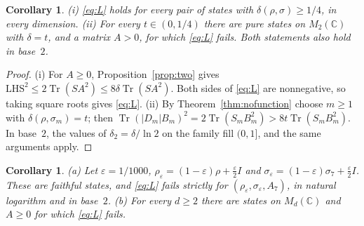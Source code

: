 \documentclass[11pt]{amsart}
\newtheorem{corollary}[theorem]{Corollary}
\theoremstyle{definition}\newtheorem{definition}[theorem]{Definition}
\theoremstyle{remark}\newtheorem{remark}[theorem]{Remark}
\DeclareMathOperator{\Tr}{Tr}
\newcommand{\C}{\mathbb{C}}
\newcommand{\abs}[1]{\lvert #1\rvert}
\newcommand{\LHS}{\mathrm{LHS}}
\begin{document}
\begin{corollary}\label{cor:threshold}
\textup{(i)} \eqref{eq:L} holds for every pair of states with \(\delta(\rho,\sigma)\ge1/4\), in every dimension. \textup{(ii)} For every \(t\in(0,1/4)\) there are pure states on \(M_2(\C)\) with \(\delta=t\), and a matrix \(A>0\), for which \eqref{eq:L} fails. Both statements also hold in base~\(2\).
\end{corollary}

\begin{proof}
(i) For \(A\ge0\), Proposition~\ref{prop:two} gives \(\LHS^2\le2\Tr(SA^2)\le8\delta\Tr(SA^2)\). Both sides of \eqref{eq:L} are nonnegative, so taking square roots gives \eqref{eq:L}. (ii) By Theorem~\ref{thm:nofunction} choose \(m\ge1\) with \(\delta(\rho,\sigma_m)=t\); then \(\Tr(\abs{D_m}B_m)^2=2\Tr(S_mB_m^2)>8t\Tr(S_mB_m^2)\). In base~\(2\), the values of \(\delta_2=\delta/\ln2\) on the family fill \((0,1]\), and the same arguments apply.
\end{proof}

\begin{corollary}\label{cor:variants}
\textup{(a)} Let \(\varepsilon=1/1000\), \(\rho_\varepsilon=(1-\varepsilon)\rho+\frac{\varepsilon}{2}I\) and \(\sigma_\varepsilon=(1-\varepsilon)\sigma_7+\frac{\varepsilon}{2}I\). These are faithful states, and \eqref{eq:L} fails strictly for \((\rho_\varepsilon,\sigma_\varepsilon,A_7)\), in natural logarithm and in base~\(2\). \textup{(b)} For every \(d\ge2\) there are states on \(M_d(\C)\) and \(A\ge0\) for which \eqref{eq:L} fails.
\end{corollary}
\end{document}
